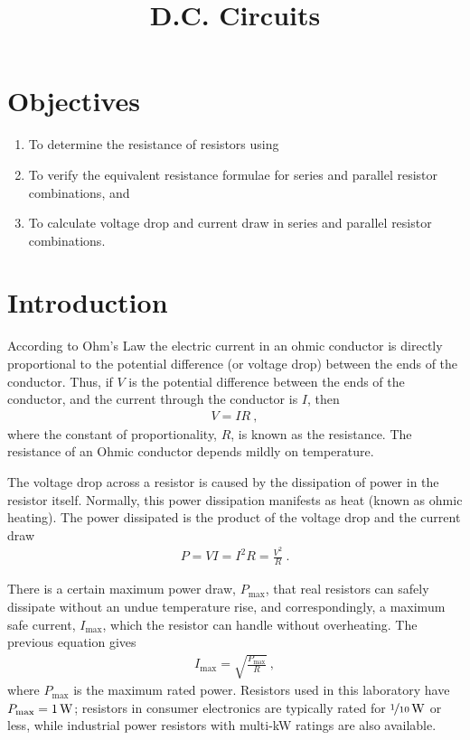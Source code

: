 \documentclass[12pt]{article}
\title{D.C. Circuits}
\author{}
\date{}
\begin{document}
\maketitle

\section{Objectives}
\label{sec:objectives}

\begin{enumerate}
\item To determine the resistance of resistors using
\item To verify the equivalent resistance formulae for series and
  parallel resistor combinations, and
\item To calculate voltage drop and current draw in series and
  parallel resistor combinations.
\end{enumerate}

\section{Introduction}
\label{sec:introduction}

According to Ohm's Law the electric current in an ohmic conductor is
directly proportional to the potential difference (or voltage drop)
between the ends of the conductor.  Thus, if $V$ is the potential
difference between the ends of the conductor, and the current through
the conductor is $I$, then
\begin{gather*}
  V = IR\ ,
\end{gather*}
where the constant of proportionality, $R$, is known as the
resistance.  The resistance of an Ohmic conductor depends mildly on
temperature.

The voltage drop across a resistor is caused by the dissipation of
power in the resistor itself.  Normally, this power dissipation
manifests as heat (known as ohmic heating).  The power dissipated is
the product of the voltage drop and the current draw
\begin{gather*}
  P = VI = I^2 R = \frac{V^2}{R}\ .
\end{gather*}

There is a certain maximum power draw, $P_\mathrm{max}$, that real
resistors can safely dissipate without an undue temperature rise, and
correspondingly, a maximum safe current, $I_\mathrm{max}$, which the
resistor can handle without overheating.  The previous equation gives
\begin{gather*}
  I_\mathrm{max} = \sqrt{\frac{P_\mathrm{max}}{R}}\ ,
\end{gather*}
where $P_\mathrm{max}$ is the maximum rated power.  Resistors used in
this laboratory have $P_\mathrm{max} = \unit[1]{W}$; resistors in
consumer electronics are typically rated for
$\unit[\nicefrac{1}{10}]{W}$ or less, while industrial power resistors
with multi-\unit{kW} ratings are also available.
\end{document}
